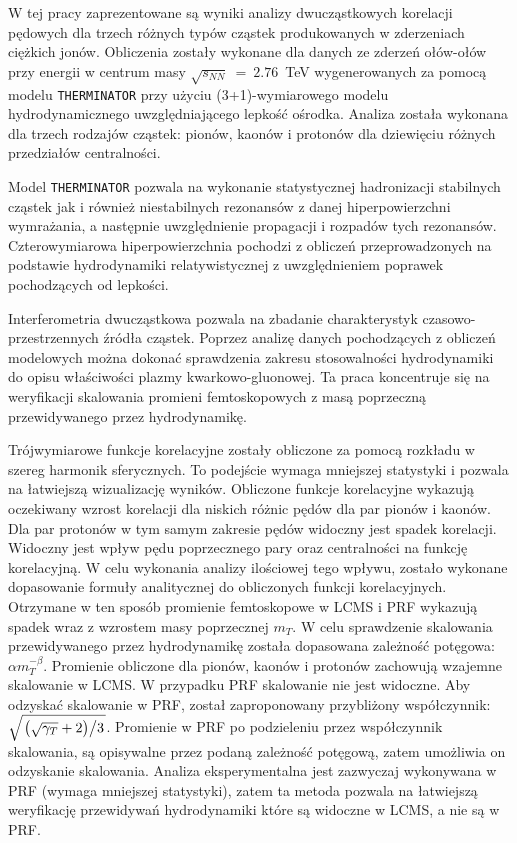 W tej pracy zaprezentowane są wyniki analizy dwucząstkowych korelacji pędowych dla trzech różnych typów cząstek produkowanych w zderzeniach ciężkich jonów.
Obliczenia zostały wykonane dla danych ze zderzeń ołów-ołów przy energii w centrum masy $\sqrt{s_{NN}}~=~2.76$~TeV wygenerowanych za pomocą modelu \verb|THERMINATOR| przy użyciu (3+1)-wymiarowego modelu hydrodynamicznego uwzględniającego lepkość ośrodka.
Analiza została wykonana dla trzech rodzajów cząstek: pionów, kaonów i protonów dla dziewięciu różnych przedziałów centralności.

Model \verb|THERMINATOR| pozwala na wykonanie statystycznej hadronizacji stabilnych cząstek jak i również niestabilnych rezonansów z danej hiperpowierzchni wymrażania, a następnie uwzględnienie propagacji i rozpadów tych rezonansów.
Czterowymiarowa hiperpowierzchnia pochodzi z obliczeń przeprowadzonych na podstawie hydrodynamiki relatywistycznej z uwzględnieniem poprawek pochodzących od lepkości.

Interferometria dwucząstkowa pozwala na zbadanie charakterystyk czasowo-przestrzennych źródła cząstek.
Poprzez analizę danych pochodzących z obliczeń modelowych można dokonać sprawdzenia zakresu stosowalności hydrodynamiki do opisu właściwości plazmy kwarkowo-gluonowej.
Ta praca koncentruje się na weryfikacji skalowania promieni femtoskopowych z masą poprzeczną przewidywanego przez hydrodynamikę.

Trójwymiarowe funkcje korelacyjne zostały obliczone za pomocą rozkładu w szereg harmonik sferycznych.
To podejście wymaga mniejszej statystyki i pozwala na łatwiejszą wizualizację wyników.
Obliczone funkcje korelacyjne wykazują oczekiwany wzrost korelacji dla niskich różnic pędów dla par pionów i kaonów.
Dla par protonów w tym samym zakresie pędów widoczny jest spadek korelacji.
Widoczny jest wpływ pędu poprzecznego pary oraz centralności na funkcję korelacyjną.
W celu wykonania analizy ilościowej tego wpływu, zostało wykonane dopasowanie formuły analitycznej do obliczonych funkcji korelacyjnych.
Otrzymane w ten sposób promienie femtoskopowe w LCMS i PRF wykazują spadek wraz z wzrostem masy poprzecznej $m_T$.
W celu sprawdzenie skalowania przewidywanego przez hydrodynamikę została dopasowana zależność potęgowa: $\alpha m_T^{-\beta}$.
Promienie obliczone dla pionów, kaonów i protonów zachowują wzajemne skalowanie w LCMS.
W przypadku PRF skalowanie nie jest widoczne.
Aby odzyskać skalowanie w PRF, został zaproponowany przybliżony współczynnik: $\sqrt{ \left. \left( \sqrt{\gamma_T} + 2 \right) \middle/ 3 \right. }$.
Promienie w PRF po podzieleniu przez współczynnik skalowania, są opisywalne przez podaną zależność potęgową, zatem umożliwia on odzyskanie skalowania.
Analiza eksperymentalna jest zazwyczaj wykonywana w PRF (wymaga mniejszej statystyki), zatem ta metoda pozwala na łatwiejszą weryfikację przewidywań hydrodynamiki które są widoczne w LCMS, a nie są w PRF.